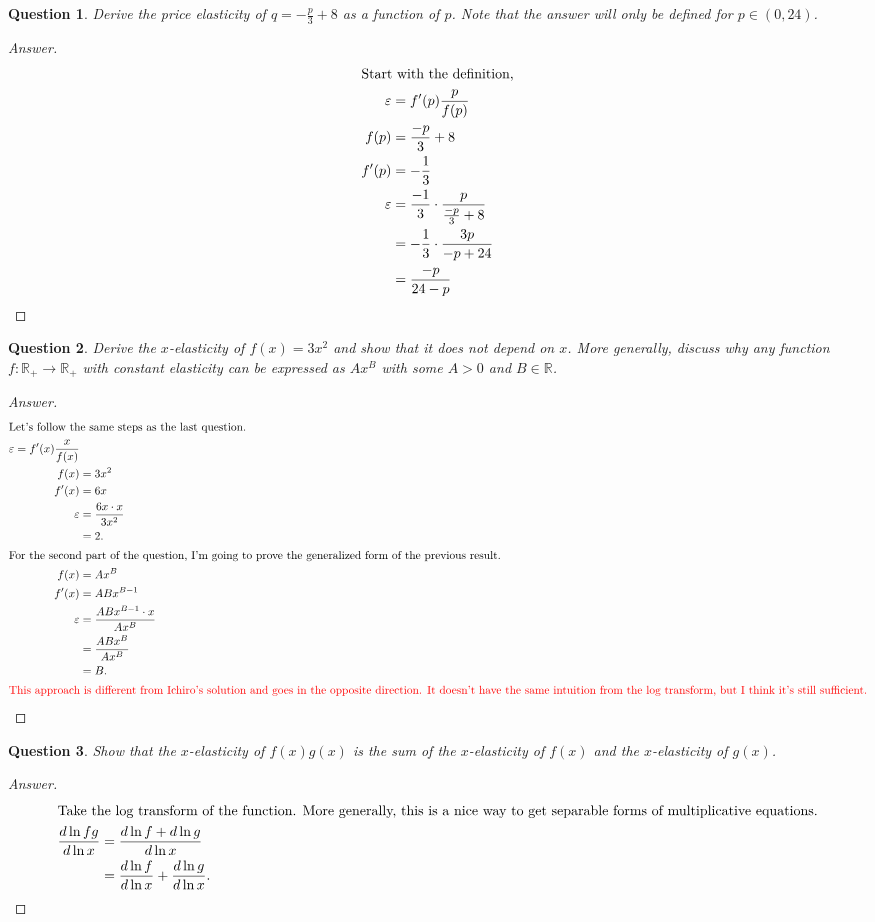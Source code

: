 \documentclass[11pt]{article}
\newtheorem{question}{Question}
\newcommand{\rd}{\textcolor{red}}
\begin{document}
\begin{question}
Derive the price elasticity of $q = -\frac{p}{3} + 8$ as a function of $p$. Note that the answer will only be defined for $p \in (0, 24)$.
\end{question}
\begin{proof}[Answer]
\begin{align*}
\intertext{Start with the definition,}
\varepsilon &= f'(p) \frac{p}{f(p)}\\
f(p) &= \frac{-p}{3} + 8\\
f'(p) &= -\frac{1}{3}\\
\varepsilon &= \frac{-1}{3} \cdot \frac{p}{\frac{-p}{3} + 8}\\
&= - \frac{1}{3} \cdot \frac{3p}{-p + 24}\\
&= \frac{-p}{24 - p}
\end{align*}
\end{proof}
\begin{question}
Derive the $x$-elasticity of $f(x) = 3x^2$ and show that it does not depend on $x$. More generally, discuss why any function $f: \mathbb{R}_+ \to \mathbb{R}_+$ with constant elasticity can be expressed as $Ax^B$ with some $A > 0$ and $B \in \mathbb{R}$.
\end{question}
\begin{proof}[Answer]
\begin{align*}
\intertext{Let's follow the same steps as the last question.}
\varepsilon = f'(x) \frac{x}{f(x)}\\
f(x) &= 3x^2\\
f'(x) &= 6x\\
\varepsilon &= \frac{6x \cdot x}{3x^2}\\
&= 2.\\
\intertext{For the second part of the question, I'm going to prove the generalized form of the previous result.}
f(x) &= Ax^B\\
f'(x) &= ABx^{B - 1}\\
\varepsilon &= \frac{AB x^{B - 1} \cdot x}{Ax^B}\\
&= \frac{ABx^B}{Ax^B}\\
&= B.\\
\intertext{\rd{This approach is different from Ichiro's solution and goes in the opposite direction. It doesn't have the same intuition from the log transform, but I think it's still sufficient.}}
\end{align*}
\end{proof}
\begin{question}
Show that the $x$-elasticity of $f(x)g(x)$ is the sum of the $x$-elasticity of $f(x)$ and the $x$-elasticity of $g(x)$.
\end{question}
\begin{proof}[Answer]
\begin{align*}
\intertext{Take the log transform of the function. More generally, this is a nice way to get separable forms of multiplicative equations.}
\frac{d \ln fg}{d \ln x} & = \frac{d \ln f + d \ln g}{d \ln x}\\
& = \frac{d \ln f}{d \ln x} + \frac{d \ln g}{d \ln x}.
\end{align*}
\end{proof}
\end{document}
